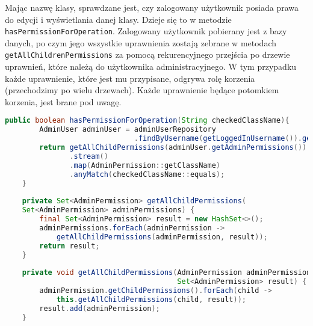 Mając nazwę klasy, sprawdzane jest, czy zalogowany użytkownik posiada prawa do edycji i wyświetlania danej klasy. Dzieje się to w metodzie \texttt{hasPermissionForOperation}. Zalogowany użytkownik pobierany jest z bazy danych, po czym jego wszystkie uprawnienia zostają zebrane w metodach \texttt{getAllChildrenPermissions} za pomocą rekurencyjnego przejścia po drzewie uprawnień, które należą do użytkownika administracyjnego. W tym przypadku każde uprawnienie, które jest mu przypisane, odgrywa rolę korzenia (przechodzimy po wielu drzewach). Każde uprawnienie będące potomkiem korzenia, jest brane pod uwagę.

\begin{small}
	\begin{lstlisting}[language=Java, frame=lines, numberstyle=\tiny, stepnumber=5, caption=Sprawdzenie uprawnień i algorytm przeszukiwania drzewa: \texttt{PermissionService.java}\label{listing_permission}., firstnumber=1]
	public boolean hasPermissionForOperation(String checkedClassName){
	    AdminUser adminUser = adminUserRepository
	                          .findByUsername(getLoggedInUsername()).get();
	    return getAllChildPermissions(adminUser.getAdminPermissions())
	           .stream()
	           .map(AdminPermission::getClassName)
	           .anyMatch(checkedClassName::equals);
	}
	
	private Set<AdminPermission> getAllChildPermissions(
	Set<AdminPermission> adminPermissions) {
	    final Set<AdminPermission> result = new HashSet<>();
	    adminPermissions.forEach(adminPermission -> 
	        getAllChildPermissions(adminPermission, result));
	    return result;
	}
	
	private void getAllChildPermissions(AdminPermission adminPermission, 
	                                    Set<AdminPermission> result) {
	    adminPermission.getChildPermissions().forEach(child ->     
	        this.getAllChildPermissions(child, result));
	    result.add(adminPermission);
	}
	\end{lstlisting} 
\end{small}

